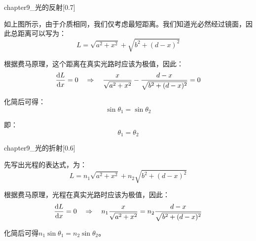 \chapter[光学]{}

\begin{prove}[Reflection]
  \begin{singlefigure}[光的反射]{chapter9_光的反射}[0.7]
  \end{singlefigure}
  如上图所示，由于介质相同，我们仅考虑最短距离。我们知道光必然经过镜面，因此总距离可以写为：
  \[L = \sqrt{a^2 + x^2}+ \sqrt{b^2 + (d-x)^2}\]

  根据费马原理，这个距离在真实光路时应该为极值，因此：
  \[\dfrac{\dif L}{\dif x} = 0\quad\Rightarrow\quad \dfrac{x}{\sqrt{a^2 + x^2}} - \dfrac{d-x}{\sqrt{b^2 + (d-x)^2}} = 0\]

  化简后可得：
  \[\sin \theta_1 = \sin \theta_2\]
  
  即：
  \[\theta_1 = \theta_2\]
\end{prove}

\begin{prove}[Refraction]
  \begin{singlefigure}[光的折射]{chapter9_光的折射}[0.6]
  \end{singlefigure}
  先写出光程的表达式，为：
  \[L = n_1\sqrt{a^2 + x^2}+ n_2\sqrt{b^2 + (d-x)^2}\]

  根据费马原理，光程在真实光路时应该为极值，因此：
  \[\dfrac{\dif L}{\dif x} = 0\quad\Rightarrow\quad n_1\dfrac{x}{\sqrt{a^2 + x^2}} = n_2\dfrac{d-x}{\sqrt{b^2 + (d-x)^2}}\]
  
  化简后可得$n_1\sin \theta_1 = n_2\sin \theta_2$。
\end{prove}

